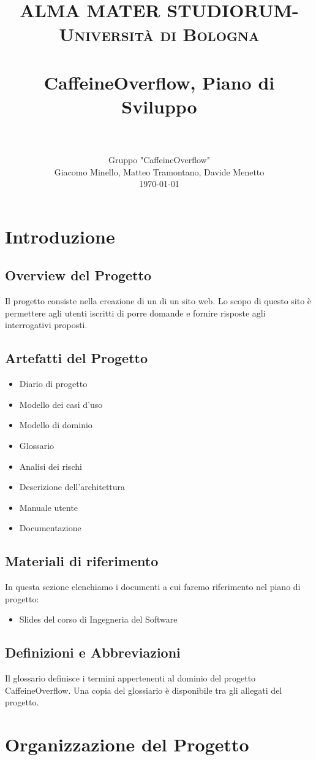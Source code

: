 \documentclass[paper=a4, fontsize=11pt]{scrartcl}
\title{
		\usefont{OT1}{bch}{b}{n}
		\normalfont \normalsize \textsc{ALMA MATER STUDIORUM- Università di Bologna} \\ [25pt]
		\horrule{0.5pt} \\[0.4cm]
		\huge CaffeineOverflow, Piano di Sviluppo \\
		\horrule{2pt} \\[0.5cm]
}
\author{ Gruppo "CaffeineOverflow"\\
		\normalfont 								\normalsize
        Giacomo Minello, Matteo Tramontano, Davide Menetto\\[-3pt]		\normalsize
        \today
}
\date{}
\numberwithin{equation}{section}		%
\numberwithin{figure}{section}			%
\numberwithin{table}{section}				%
\begin{document}
\maketitle
\section{Introduzione}
\subsection{Overview del Progetto}
Il progetto consiste nella creazione di un di un sito web. Lo scopo di questo sito è permettere agli utenti iscritti di porre domande e fornire risposte agli interrogativi proposti.
\subsection{Artefatti del Progetto}
\begin{itemize}
\item Diario di progetto
\item Modello dei casi d'uso
\item Modello di dominio
\item Glossario
\item Analisi dei rischi
\item Descrizione dell'architettura
\item Manuale utente
\item Documentazione
\end{itemize}
\subsection{Materiali di riferimento}
In questa sezione elenchiamo i documenti a cui faremo riferimento nel piano di progetto:
\begin{itemize}
    \item Slides del corso di Ingegneria del Software
\end{itemize}
\subsection{Definizioni e Abbreviazioni}
Il glossario definisce i termini appertenenti al dominio del progetto CaffeineOverflow. Una copia del glossiario è disponibile tra gli allegati del progetto.
\section{Organizzazione del Progetto}
\end{document}
